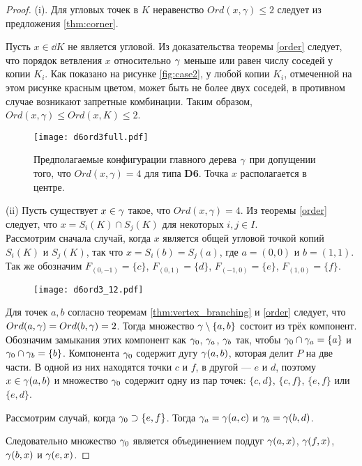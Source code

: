 \begin{proof}
(i). Для угловых точек в $K$ неравенство $Ord(x,\gamma)\leq2$ следует из предложения \ref{thm:corner}.

Пусть $x\in\dd K$ не является угловой.
Из доказательства теоремы \ref{order} следует, что порядок ветвления $x$ относительно $\gamma$ меньше или равен числу соседей у копии $K_i$. 
Как показано на рисунке \ref{fig:case2}, у любой копии $K_i$, отмеченной на этом рисунке красным цветом, может быть не более двух соседей, в противном случае возникают запретные комбинации. 
Таким образом, $Ord(x,\gamma)\leq Ord(x,K)\leq2$.
\begin{figure}[H]
    \centering
    \texttt{[image: d6ord3full.pdf]}
    \caption{Предполагаемые конфигурации главного дерева $\gamma$ при допущении того, что $Ord(x,\gamma)=4$ для типа {\bf D6}. Точка $x$ располагается в центре.}
    \label{fig:d6ord3full}
\end{figure}

(ii)  Пусть существует $x\in\gamma$ такое, что $Ord(x,\gamma)=4.$
Из теоремы \ref{order} следует, что  $x=S_i(K)\cap S_j(K)$ для некоторых $i,j\in I$.\\
Рассмотрим сначала случай, когда $x$ является общей угловой точкой копий  $S_i(K)$ и $S_j(K)$, так что $x=S_i(b)=S_j(a)$, где $a=(0,0)$ и $b=(1,1)$. 
Так же обозначим $F_{(0,-1)}=\{c\}$, $F_{(0,1)}=\{d\}$, $F_{(-1,0)}=\{e\}$, $F_{(1,0)}=\{f\}$.

\begin{figure}[H]
    \centering \texttt{[image: d6ord3\_12.pdf]}
\end{figure}

Для точек $a,b$ согласно теоремам \ref{thm:vertex_branching} и \ref{order} следует, что $Ord(a,\gamma)=Ord(b,\gamma)=2$. 
Тогда множество $\gamma\setminus\{a,b\}$ состоит из трёх компонент. 
Обозначим замыкания этих компонент как $\gamma_0$, $\gamma_a$, $\gamma_b$ так, чтобы $\gamma_0\cap\gamma_a=\{a\}$ и $\gamma_0\cap \gamma_b=\{b\}$. 
Компонента $\gamma_0$ содержит дугу $\gamma(a,b)$, которая делит $P$ на две части. 
В одной из них находятся точки $c$ и $f$, в другой --- $e$ и $d$, поэтому $x\in \gamma(a,b)$ и множество $\gamma_0$ содержит одну из пар точек: $\{c,d\}$, $\{c,f\}$, $\{e,f\}$ или $\{e,d\}$.

Рассмотрим случай, когда $\gamma_0\supset\{e,f\}$. 
Тогда $\gamma_a=\gamma(a,c)$ и $\gamma_b=\gamma(b,d)$.

Следовательно множество $\gamma_0$ является объединением поддуг $\gamma(a,x)$, $\gamma(f,x)$, $\gamma(b,x)$ и $\gamma(e,x)$.


\end{proof}
